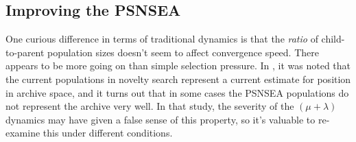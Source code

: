 \documentclass[twoside]{article}
\begin{document}
%
%


\subsection{Improving the PSNSEA}
\label{subsec:psnsea:improve}

One curious difference in terms of traditional dynamics is that the \emph{ratio} of child-to-parent population sizes doesn't seem to affect convergence speed.  There appears to be more going on than simple selection pressure.  In \citet{Wiegand2021flairs}, it was noted that the current populations in novelty search represent a current estimate for position in archive space, and it turns out that in some cases the PSNSEA populations do not represent the archive very well.  In that study, the severity of the $(\mu+\lambda)$ dynamics may have given a false sense of this property, so it's valuable to re-examine this under different conditions.
\end{document}
